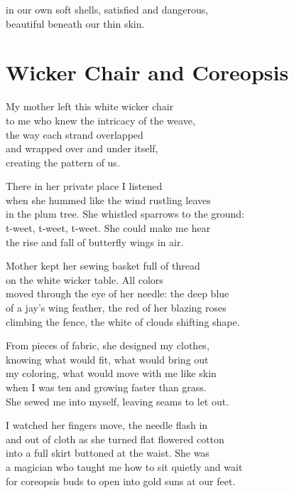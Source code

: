 \documentclass[twoside,10pt]{book}
\begin{document}
in our own soft shells, satisfied and dangerous,\\
beautiful beneath our thin skin.


\clearpage
\section{Wicker Chair and Coreopsis}

My mother left this white wicker chair\\
to me who knew the intricacy of the weave,\\
the way each strand overlapped\\
and wrapped over and under itself,\\
creating the pattern of us.

There in her private place I listened\\
when she hummed like the wind rustling leaves\\
in the plum tree. She whistled sparrows to the ground:\\
t-weet, t-weet, t-weet. She could make me hear\\
the rise and fall of butterfly wings in air.

Mother kept her sewing basket full of thread\\
on the white wicker table. All colors\\
moved through the eye of her needle: the deep blue\\
of a jay's wing feather, the red of her blazing roses\\
climbing the fence, the white of clouds shifting shape.

From pieces of fabric, she designed my clothes,\\
knowing what would fit, what would bring out\\
my coloring, what would move with me like skin\\
when I was ten and growing faster than grass.\\
She sewed me into myself, leaving seams to let out.

I watched her fingers move, the needle flash in\\
and out of cloth as she turned flat flowered cotton\\
into a full skirt buttoned at the waist. She was\\
a magician who taught me how to sit quietly and wait\\
for coreopsis buds to open into gold suns at our feet.
\end{document}
